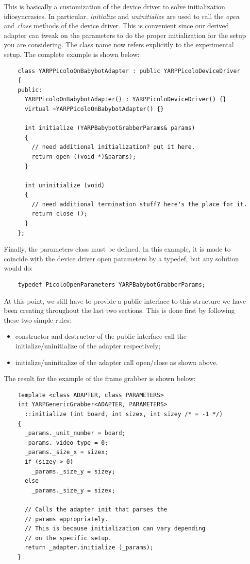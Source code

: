 This is basically a customization of the device driver to solve initialization idiosyncrasies. In particular, {\em initialize} and {\em uninitialize} are used to call the {\em open} and {\em close} methods of the device driver. This is convenient since our derived adapter can tweak on the parameters to do the proper initialization for the setup you are considering. The class name now refers explicitly to the experimental setup. The complete example is shown below:

\begin{verbatim}
    class YARPPicoloOnBabybotAdapter : public YARPPicoloDeviceDriver
    {
    public:
      YARPPicoloOnBabybotAdapter() : YARPPicoloDeviceDriver() {}
      virtual ~YARPPicoloOnBabybotAdapter() {}

      int initialize (YARPBabybotGrabberParams& params)
      {
        // need additional initialization? put it here.
        return open ((void *)&params);
      }

      int uninitialize (void)
      {
        // need additional termination stuff? here's the place for it.
        return close ();
      }
    };
\end{verbatim}

Finally, the parameters class must be defined. In this example, it is made to coincide with the device driver open parameters by a typedef, but any solution would do:

\begin{verbatim}
    typedef PicoloOpenParameters YARPBabybotGrabberParams;
\end{verbatim}

At this point, we still have to provide a public interface to this structure we have been creating throughout the last two sections. This is done first by following these two simple rules:
\begin{itemize}

\item constructor and destructor of the public interface call the initialize/uninitialize of the adapter respectively;

\item initialize/uninitialize of the adapter call open/close as shown above.

\end{itemize}

The result for the example of the frame grabber is shown below:

\begin{verbatim}
    template <class ADAPTER, class PARAMETERS>
    int YARPGenericGrabber<ADAPTER, PARAMETERS>
      ::initialize (int board, int sizex, int sizey /* = -1 */)
    {
      _params._unit_number = board;
      _params._video_type = 0;
      _params._size_x = sizex;
      if (sizey > 0)
        _params._size_y = sizey;
      else
        _params._size_y = sizex;

      // Calls the adapter init that parses the 
      // params appropriately.
      // This is because initialization can vary depending 
      // on the specific setup.
      return _adapter.initialize (_params);
    }
\end{verbatim}

